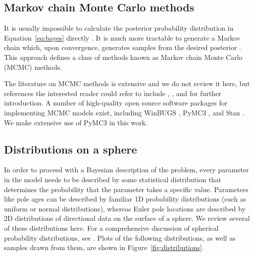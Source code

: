 \documentclass[11pt,letterpaper]{article}
\begin{document}
\subsection*{Markov chain Monte Carlo methods}

It is usually impossible to calculate the posterior probability distribution in Equation~\eqref{eq:bayes} directly \citep{Davidson-Pilon2015a}.  It is much more tractable to generate a Markov chain which, upon convergence, generates samples from the desired posterior \citep{Gelman2013a}. This approach defines a class of methods known as Markov chain Monte Carlo (MCMC) methods.

The literature on MCMC methods is extensive and we do not review it here, but references the interested reader could refer to include \citet{Gelman1996a}, \citet{Sambridge2013a}, and \citet{Davidson-Pilon2015a} for further introduction. A number of high-quality open source software packages for implementing MCMC models exist, including WinBUGS \citep{Lunn2000a}, PyMC3 \citep{Salvatier2016a}, and Stan \citep{Carpenter2017a}. We make extensive use of PyMC3 in this work.

\subsection*{Distributions on a sphere}

In order to proceed with a Bayesian description of the problem, every parameter in the model needs to be described by some statistical distribution that determines the probability that the parameter takes a specific value. Parameters like pole ages can be described by familiar 1D probability distributions (such as uniform or normal distributions), whereas Euler pole locations are described by 2D distributions of directional data on the surface of a sphere. We review several of these distributions here. For a comprehensive discussion of spherical probability distributions,
see \citet{Fisher1987a}. Plots of the following distributions, as well as samples drawn from them, are shown in Figure~\ref{fig:distributions}. 
\end{document}
